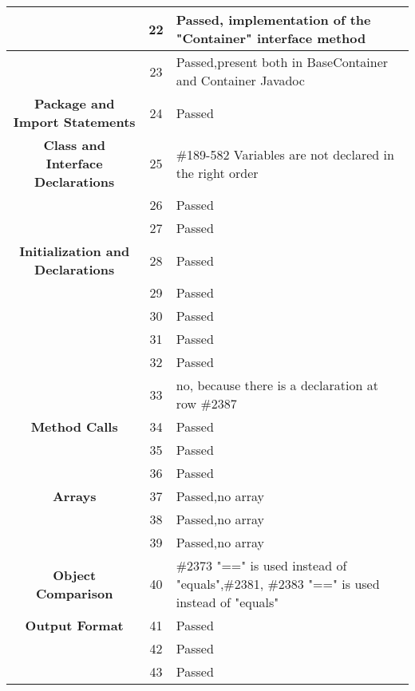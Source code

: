 \documentclass[11pt, a4paper,titlepage]{article}
\begin{document}
 \newpage
 \begin{tabularx}{\textwidth}{| c |c |X |}
 	\hline  & 22 & Passed, implementation of the "Container" interface method
 	\\
 	\hline  & 23 & Passed,present both in BaseContainer and Container Javadoc
 	\\
 	\hline \textbf{Package and Import Statements} & 24 & Passed \\
 	\hline \textbf{Class and Interface Declarations} & 25 & \#189-582 Variables are not declared in the right order \\
 	\hline  & 26 & Passed \\
 	\hline  & 27 & Passed \\
 	\hline \textbf{Initialization and Declarations} & 28 & Passed \\
 	\hline  & 29 & Passed \\
 	\hline  & 30 & Passed \\
 	\hline  & 31 & Passed \\
 	\hline  & 32 & Passed \\
 	\hline  & 33 & no, because there is a declaration at row \#2387 \\
 	\hline \textbf{Method Calls} & 34 & Passed \\
 	\hline  & 35 & Passed \\
 	\hline  & 36 & Passed \\
 	\hline \textbf{Arrays} & 37 & Passed,no array \\
 	\hline  & 38 & Passed,no array \\
 	\hline  & 39 & Passed,no array \\ 
 	\hline \textbf{Object Comparison} & 40 & \#2373 "==" is used instead of "equals",\#2381, \#2383 "==" is used instead of  "equals"
 	\\
 	\hline \textbf{Output Format} & 41 & Passed \\
 	\hline  & 42 & Passed \\
 	\hline  & 43 & Passed \\
 	\hline
 \end{tabularx}
 \newpage
\end{document}

